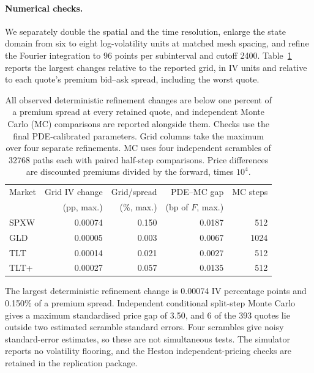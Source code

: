 \paragraph{Numerical checks.}
We separately double the spatial and the time resolution, enlarge the state domain
from six to eight log-volatility units at matched mesh spacing, and refine the
Fourier integration to 96 points per subinterval and cutoff 2400. Table~\ref{tab:oca-pde-checks}
reports the largest changes relative to the reported grid, in IV units and relative
to each quote's premium bid--ask spread, including the worst quote.

\begin{table}[htbp]\centering\small
\begin{tabular}{@{}l r r r r@{}}\toprule
Market & Grid IV change & Grid/spread & PDE--MC gap & MC steps\\
 & (pp, max.) & (\%, max.) & (bp of $F$, max.) & \\\midrule

SPXW & 0.00074 & 0.150 & 0.0187 & 512 \\

GLD & 0.00005 & 0.003 & 0.0067 & 1024 \\

TLT & 0.00014 & 0.021 & 0.0027 & 512 \\

TLT+ & 0.00027 & 0.057 & 0.0135 & 512 \\

\bottomrule\end{tabular}
\caption{All observed deterministic refinement changes are below one percent of a
premium spread at every retained quote, and independent Monte Carlo (MC) comparisons are
reported alongside them. Checks use the final PDE-calibrated parameters. Grid
columns take the maximum over four separate refinements. MC uses four independent
scrambles of 32768 paths each with paired half-step comparisons. Price differences
are discounted premiums divided by the forward, times $10^4$.}
\label{tab:oca-pde-checks}\end{table}

The largest deterministic refinement change is 0.00074 IV percentage
points and 0.150\% of a premium spread. Independent conditional
split-step Monte Carlo gives a maximum standardised price gap of 3.50, and 6 of the 393 quotes lie outside two
estimated scramble standard errors. Four scrambles give noisy standard-error
estimates, so these are not simultaneous tests. The simulator reports no volatility
flooring, and the Heston independent-pricing checks are retained in the replication package.

